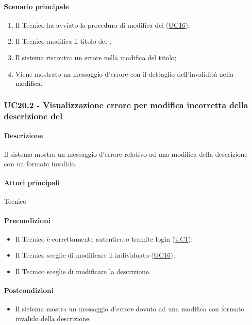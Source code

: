 \paragraph*{Scenario principale}
\begin{enumerate}
  \item Il Tecnico ha avviato la procedura di modifica del  (\hyperref[UC16]{UC16});
  \item Il Tecnico modifica il titolo del ;
  \item Il sistema riscontra un errore nella modifica del titolo;
  \item Viene mostrato un messaggio d'errore con il dettaglio dell'invalidità nella modifica.  
\end{enumerate}


\subsubsection{UC20.2 - Visualizzazione errore per modifica incorretta della descrizione del }\label{UC20point2}
\paragraph*{Descrizione}
Il sistema mostra un messaggio d’errore relativo ad una modifica della descrizione con un formato invalido.

\paragraph*{Attori principali}
Tecnico

\paragraph*{Precondizioni}
\begin{itemize}
  \item Il Tecnico è correttamente autenticato tramite login (\hyperref[UC1]{UC1});
  \item Il Tecnico sceglie di modificare il  individuato (\hyperref[UC16]{UC16});
  \item Il Tecnico sceglie di modificare la descrizione.
\end{itemize}

\paragraph*{Postcondizioni}
\begin{itemize}
  \item Il sistema mostra un messaggio d’errore dovuto ad una modifica con formato invalido della descrizione.
\end{itemize}

